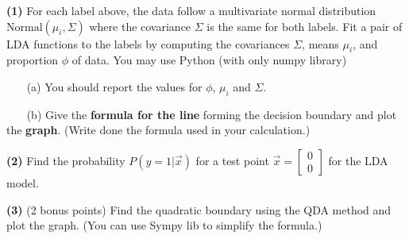 \documentclass[11pt]{paper}
\theoremstyle{definition}
\newcommand{\vx}{\vec{x}}
\begin{document}
 
 
   
  
\textbf{ (1)}   For each label above, the data follow a multivariate normal distribution $\textrm{Normal} (\mu_i, \Sigma)$  where the covariance $\Sigma$ is the same for both labels. Fit a pair of LDA functions to the labels by computing the covariances  $\Sigma$, means $\mu_i$, and proportion $\phi$ of data. You may use Python (with only numpy library)
 
~~~ (a) You should report the values for $\phi$, $\mu_i$ and $\Sigma$.  
 
\vfill
  
~~~ (b) Give the \textbf{formula for the line} forming the decision boundary and plot the \textbf{graph}.  (Write done the formula used in your calculation.)
 
 
 
\vfill
 
 
\textbf{(2)} Find the probability $P(y=1 | \vx)$ for a test point $\vx=\begin{bmatrix}
0\\
0
\end{bmatrix}
$ for the LDA model.

\vfill

 

\textbf{(3) }(2 bonus points) Find the quadratic boundary using the QDA method and plot the graph.    (You can use Sympy lib to simplify the formula.)

 \vfill
 
\end{document}
